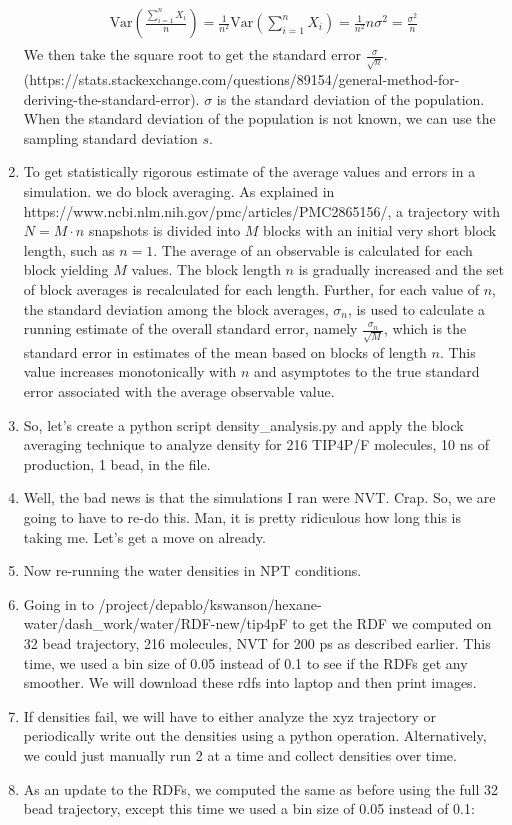 \documentclass[12pt,reqno]{amsart}
\numberwithin{equation}{section}
\begin{document}
\begin{enumerate}
\begin{align}
\begin{split}
\text{Var}\left(\frac{\sum_{i=1}^nX_i}{n}\right) = \frac{1}{n^2}\text{Var}\left(\sum_{i=1}^nX_i\right) = \frac{1}{n^2}n\sigma^2 = \frac{\sigma^2}{n}
\end{split}
\end{align} 
We then take the square root to get the standard error $\frac{\sigma}{\sqrt{n}}$.  (https://stats.stackexchange.com/questions/89154/general-method-for-deriving-the-standard-error).  $\sigma$ is the standard deviation of the population. When the standard deviation of the population is not known, we can use the sampling standard deviation $s$.  
\item To get statistically rigorous estimate of the average values and errors in a simulation. we do block averaging.  As explained in https://www.ncbi.nlm.nih.gov/pmc/articles/PMC2865156/, a trajectory with $N = M\cdot n$ snapshots is divided into $M$ blocks with an initial very short block length, such as $n = 1$.  The average of an observable is calculated for each block yielding $M$ values.  The block length $n$ is gradually increased and the set of block averages is recalculated for each length.  Further, for each value of $n$, the standard deviation among the block averages, $\sigma_n$, is used to calculate a running estimate of the overall standard error, namely $\frac{\sigma_n}{\sqrt{M}}$, which is the standard error in estimates of the mean based on blocks of length $n$.  This value increases monotonically with $n$ and asymptotes to the true standard error associated with the average observable value.  
\item So, let's create a python script density\_analysis.py and apply the block averaging technique to analyze density for 216 TIP4P/F molecules, 10 ns of production, 1 bead, in the file.
\item Well, the bad news is that the simulations I ran were NVT.  Crap.  So, we are going to have to re-do this.  Man, it is pretty ridiculous how long this is taking me.  Let's get a move on already. 
\item Now re-running the water densities in NPT conditions.   
\item Going in to /project/depablo/kswanson/hexane-water/dash\_work/water/RDF-new/tip4pF to get the RDF we computed on 32 bead trajectory, 216 molecules, NVT for 200 ps as described earlier.  This time, we used a bin size of 0.05 instead of 0.1 to see if the RDFs get any smoother.  We will download these rdfs into laptop and then print images. 
\item If densities fail, we will have to either analyze the xyz trajectory or periodically write out the densities using a python operation.  Alternatively, we could just manually run 2 at a time and collect densities over time.    
\item As an update to the RDFs, we computed the same as before using the full 32 bead trajectory, except this time we used a bin size of 0.05 instead of 0.1:


\end{enumerate}
\end{document}
